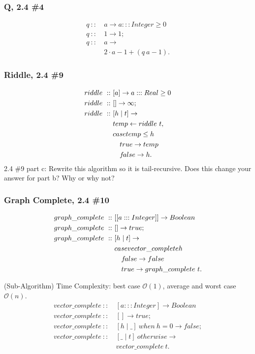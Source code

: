 \documentclass[a4paper,10pt]{book}
\newcommand{\false}{f\kern-0.25ex{alse}}
\begin{document}
\subsubsection{Q, 2.4 \#4}

\begin{align*}
q\ ::\ &a\rightarrow a:::Integer\ge 0\\
q\ ::\ &1\rightarrow 1;\\
q\ ::\ &a\rightarrow\\
	&2\cdot a-1+(q\ a-1).
\end{align*}

\subsubsection{Riddle, 2.4 \#9}

\begin{align*}
riddle\ ::\ &[a]\rightarrow a:::Real\ge 0\\
riddle\ ::\ &[]\rightarrow \infty;\\
riddle\ ::\ &[h\mid t]\rightarrow\\
	&temp\leftarrow riddle\ t,\\
	&case temp\le h\\
	&\quad true\rightarrow temp\\
	&\quad\false\rightarrow h.
\end{align*}
2.4 \#9 part c: Rewrite this algorithm so it is tail-recursive. Does this change your answer for part b? Why or why not?

\subsubsection{Graph Complete, 2.4 \#10}

\begin{align*}
graph\_complete\ ::\ &[[a:::Integer]]\rightarrow Boolean\\
graph\_complete\ ::\ &[]\rightarrow true;\\
graph\_complete\ ::\ &[h\mid t]\rightarrow\\
	&case vector\_complete h\\
	&\quad\false\rightarrow false\\
	&\quad true\rightarrow graph\_complete\ t.
\end{align*}

(Sub-Algorithm) Time Complexity: best case $\mathcal{O}(1)$, average and worst case $\mathcal{O}(n)$.
\begin{align*}
vector\_complete\ ::\ &[a:::Integer]\rightarrow Boolean\\
vector\_complete\ ::\ &[]\rightarrow true;\\
vector\_complete\ ::\ &[h\mid \_]\ when\ h=0\rightarrow false;\\
vector\_complete\ ::\ &[\_\mid t]\ otherwise\rightarrow\\
	&vector\_complete\ t.
\end{align*}
\end{document}

